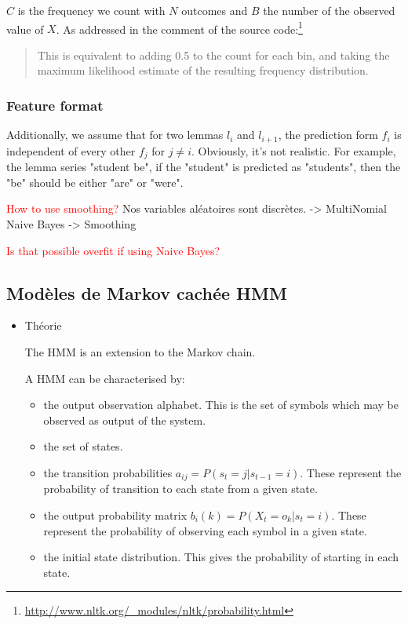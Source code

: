 \documentclass[a4paper]{article}
\begin{document}
{$C$ is the frequency we count with $N$ outcomes and $B$ the number of the observed value of $X$. As addressed in the comment of the source code:\footnote{\url{http://www.nltk.org/_modules/nltk/probability.html}}
\begin{quotation}
This is equivalent to adding 0.5 to the count for each bin, and taking the maximum likelihood estimate of the resulting frequency distribution.
\end{quotation}


\subsubsection{Feature format}


Additionally, we assume that for two lemmas $l_i$ and $l_{i+1}$, the prediction form $f_{i}$ is independent of every other $f_{j}$ for $j \neq i$. Obviously, it's not realistic. For example, the lemma series "student be", if the "student" is predicted as "students", then the "be" should be either "are" or "were". 



\textcolor{red}{How to use smoothing?}
{ Nos variables aléatoires sont discrètes. -> MultiNomial Naive Bayes -> Smoothing}

\textcolor{red}{Is that possible overfit if using Naive Bayes?}

\subsection{Modèles de Markov cachée HMM}
\begin{itemize}
\item Théorie

The HMM is an extension to the Markov chain.



A HMM can be characterised by:
\begin{itemize}
\item the output observation alphabet. This is the set of symbols which may be observed as output of the system.
\item the set of states.
\item the transition probabilities $a_{ij} = P(s_t = j | s_{t-1} = i)$. These represent the probability of transition to each state from a given state.
\item the output probability matrix $b_i(k) = P(X_t = o_k | s_t = i)$. These represent the probability of observing each symbol in a given state.
\item the initial state distribution. This gives the probability of starting in each state.
\end{itemize}


\end{itemize}}
\end{document}
